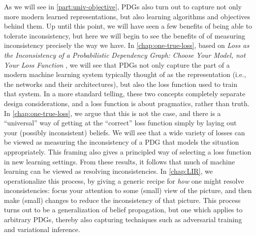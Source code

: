 \textbf{}
As we will see in \cref{part:univ-objective}, 
PDGs also turn out to capture not only more modern learned representations, 
    but also learning algorithms and objectives behind them. 
Up until this point, we will have seen a few benefits of being able to tolerate inconsistency, but here we will begin to see the benefits of of measuring inconsistency precisely the way we have. 
In \cref{chap:one-true-loss}, 
based on
\textit{Loss as the Inconsistency of a Probabilistic Dependency Graph: Choose Your Model, not Your Loss Function} \citep{one-true-loss}, 
we will see that PDGs not only capture the part of a modern machine learning system typically thought of as the representation (i.e., the networks and their architectures), but also the loss function used to train that system.  
In a more standard telling, these two concepts completely separate design considerations, and a loss function is about pragmatics, rather than truth. 
In \cref{chap:one-true-loss}, we argue that this is not the case, and there is a ``universal'' way of getting at the ``correct'' loss function simply by laying out your (possibly inconsistent) beliefs. 
We will see that a wide variety of losses can be viewed as measuring the inconsistency of a PDG that models the situation appropriately. 
This framing also gives a principled way of selecting a loss function in new learning settings. 
%
From these results, it follows that much of machine learning can be viewed as resolving inconsistencies. 
%
In \cref{chap:LIR}, we operationalize this process, by giving a generic recipe for \emph{how} one might resolve inconsistencies:
focus your attention to some (small) view of the picture, and then make (small) changes to reduce the inconsistency of that picture. 
%
This process turns out to be a generalization of {belief propagation}, but one which applies to arbitrary PDGs, thereby also capturing techniques such as adversarial training and variational inference. 


